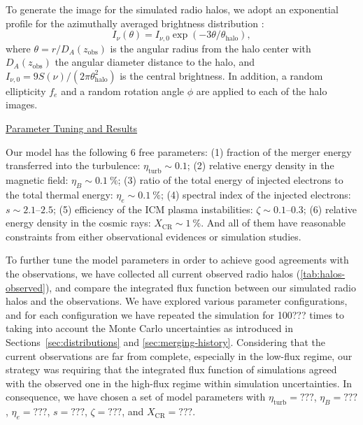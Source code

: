 \documentclass[modern]{aastex62}
\newcommand{\R}[1]{\mathrm{#1}}
\begin{document}
To generate the image for the simulated radio halos, we adopt an exponential
profile for the azimuthally averaged brightness distribution \citep{murgia2009}:
\begin{equation}
  \label{eq:halo-profile}
  I_{\nu}(\theta) = I_{\nu,0} \exp(-3 \theta / \theta_{\R{halo}}),
\end{equation}
where $\theta = r / D_A(z_{\R{obs}})$ is the angular radius from the halo
center with $D_A(z_{\R{obs}})$ the angular diameter distance to the halo,
and $I_{\nu,0} = 9 S(\nu) / (2\pi \theta^2_{\R{halo}})$ is the central
brightness.
In addition, a random ellipticity $f_e$ and a random rotation angle
$\phi$ are applied to each of the halo images.

\vspace{1ex}
\uline{Parameter Tuning and Results}

Our model has the following 6 free parameters:
(1) fraction of the merger energy transferred into the turbulence:
$\eta_{\R{turb}} \sim 0.1$;
(2) relative energy density in the magnetic field:
$\eta_B \sim \SI{0.1}{\percent}$;
(3) ratio of the total energy of injected electrons to the total thermal
energy: $\eta_e \sim \SI{0.1}{\percent}$;
(4) spectral index of the injected electrons: $s \sim \numrange{2.1}{2.5}$;
(5) efficiency of the ICM plasma instabilities:
$\zeta \sim \numrange{0.1}{0.3}$;
(6) relative energy density in the cosmic rays:
$X_{\R{CR}} \sim \SI{1}{\percent}$.
And all of them have reasonable constraints from either observational
evidences or simulation studies.

To further tune the model parameters in order to achieve good agreements
with the observations, we have collected all current observed radio halos
(\autoref{tab:halos-observed}), and compare the integrated flux function
between our simulated radio halos and the observations.
We have explored various parameter configurations,
and for each configuration we have repeated the simulation for 100??? times
to taking into account the Monte Carlo uncertainties as introduced in
Sections~\ref{sec:distributions} and \ref{sec:merging-history}.
Considering that the current observations are far from complete,
especially in the low-flux regime, our strategy was requiring that the
integrated flux function of simulations agreed with the observed one
in the high-flux regime within simulation uncertainties.
In consequence, we have chosen a set of model parameters with
$\eta_{\R{turb}} = ???$, $\eta_B = ???$, $\eta_e = ???$, $s = ???$,
$\zeta = ???$, and $X_{\R{CR}} = ???$.
\end{document}
